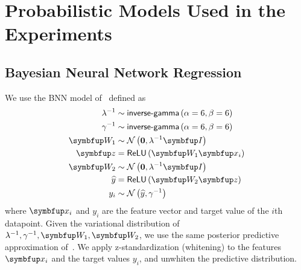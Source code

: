 
\section{Probabilistic Models Used in the Experiments}
\subsection{Bayesian Neural Network Regression}\label{section:model_bnn}
We use the BNN model of~\citet{pmlr-v37-hernandez-lobatoc15} defined as
\begin{align*}
  \lambda^{-1} &\sim \mathsf{inverse\text{-}gamma}\left(\alpha=6, \beta=6\right) \\
  \gamma^{-1}  &\sim \mathsf{inverse\text{-}gamma}\left(\alpha=6, \beta=6\right) \\
  \mW_1       &\sim \mathcal{N}\left(\mathbf{0}, \lambda^{-1} \mI \right) \\
  \vz         &= \mathsf{ReLU}\left(\mW_1 \vx_i\right) \\
  \mW_2       &\sim \mathcal{N}\left(\mathbf{0}, \lambda^{-1} \mI \right) \\
  \widehat{y} &= \mathsf{ReLU}\left(\mW_2 \vz\right) \\
  y_i         &\sim \mathcal{N}\left(\widehat{y}, \gamma^{-1}\right)
\end{align*}
where \(\vx_i\) and \(y_i\) are the feature vector and target value of the \(i\)th datapoint.
Given the variational distribution of \(\lambda^{-1}, \gamma^{-1}, \mW_1, \mW_2\), we use the same posterior predictive approximation of~\citet{pmlr-v37-hernandez-lobatoc15}.
We apply z-standardization (whitening) to the features \(\vx_i\) and the target values \(y_i\), and unwhiten the predictive distribution.

